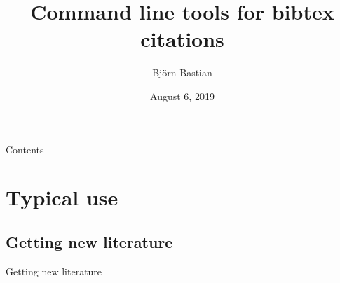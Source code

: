 \documentclass[xcolor={table,dvipsnames}]{beamer}
\author{Björn Bastian}
\title[Citation tools]{Command line tools for bibtex citations}
\date{August 6, 2019}
\newcommand{\bashcmd}[2][-0.6\baselineskip]{%
  \vspace{#1}%
}
\newcommand{\bashout}[2][-0.1\baselineskip]{%
  \vspace{#1}%
}
\begin{document}
\begin{frame}[plain]
  \titlepage
\end{frame}

\begin{frame}{Contents}
  \tableofcontents
\end{frame}

\section{Typical use}

\subsection{Getting new literature}
\begin{frame}{Getting new literature}
  \begin{minipage}[t]{.6\textwidth}
    \vspace{-0.6\baselineskip}
    \uncover<1->{\bashcmd{cmdline/new/d1-1-in.txt}}%
    \uncover<1->{\bashout{cmdline/new/d1-1-out.txt}}%
    \uncover<3->{\bashcmd{cmdline/new/d1-2-in.txt}}%
    \uncover<3->{\bashout{cmdline/new/d1-2-out.txt}}%
    \uncover<4->{\bashcmd{cmdline/new/d1-3-in.txt}}%
    \uncover<4->{\bashout{cmdline/new/d1-3-out.txt}}%
  \end{minipage}%
  \hfill%
  \begin{minipage}[t]{.34\textwidth}
    \hbox{\;}

\end{minipage}
\end{frame}
\end{document}
